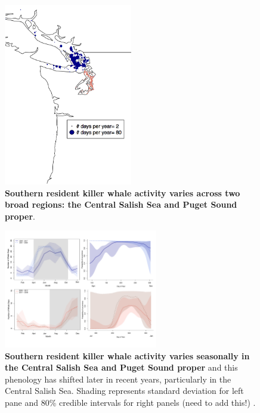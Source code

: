 \documentclass{article}
\begin{document}
\begin{figure}[p]
\includegraphics[width=0.5\textwidth]{../analyses/figures/OrcaPhenPlots/srkw_justmap_assumeSRKW_April1.png} 
\caption{\textbf{Southern resident killer whale activity varies across two broad regions: the Central Salish Sea and Puget Sound proper}. }
 \label{fig:map}
 \end{figure}
 
\begin{figure}[p]
\includegraphics[width=0.6\textwidth]{../analyses/figures/OrcaPhenPlots/WhaleDaysProbOCc_4panels.pdf} 
\caption{\textbf{Southern resident killer whale activity varies seasonally in the Central Salish Sea and Puget Sound proper} and this phenology has shifted later in recent years, particularly in the Central Salish Sea. Shading represents standard deviation for left pane and 80\% credible intervals for right panels (need to add this!) .}
\label{fig:phenplot}
 \end{figure}
\end{document}
